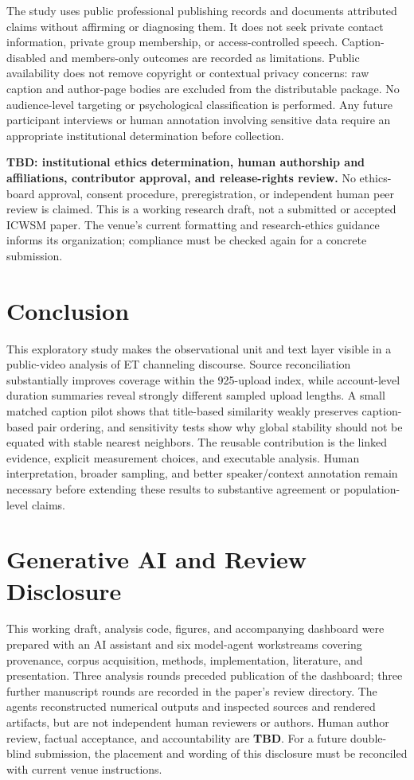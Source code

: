 The study uses public professional publishing records and documents attributed claims without affirming or diagnosing them. It does not seek private contact information, private group membership, or access-controlled speech. Caption-disabled and members-only outcomes are recorded as limitations. Public availability does not remove copyright or contextual privacy concerns: raw caption and author-page bodies are excluded from the distributable package. No audience-level targeting or psychological classification is performed. Any future participant interviews or human annotation involving sensitive data require an appropriate institutional determination before collection.

\textbf{TBD: institutional ethics determination, human authorship and affiliations, contributor approval, and release-rights review.} No ethics-board approval, consent procedure, preregistration, or independent human peer review is claimed. This is a working research draft, not a submitted or accepted ICWSM paper. The venue's current formatting and research-ethics guidance informs its organization; compliance must be checked again for a concrete submission.

\section{Conclusion}
This exploratory study makes the observational unit and text layer visible in a public-video analysis of ET channeling discourse. Source reconciliation substantially improves coverage within the 925-upload index, while account-level duration summaries reveal strongly different sampled upload lengths. A small matched caption pilot shows that title-based similarity weakly preserves caption-based pair ordering, and sensitivity tests show why global stability should not be equated with stable nearest neighbors. The reusable contribution is the linked evidence, explicit measurement choices, and executable analysis. Human interpretation, broader sampling, and better speaker/context annotation remain necessary before extending these results to substantive agreement or population-level claims.

\section*{Generative AI and Review Disclosure}
This working draft, analysis code, figures, and accompanying dashboard were prepared with an AI assistant and six model-agent workstreams covering provenance, corpus acquisition, methods, implementation, literature, and presentation. Three analysis rounds preceded publication of the dashboard; three further manuscript rounds are recorded in the paper's review directory. The agents reconstructed numerical outputs and inspected sources and rendered artifacts, but are not independent human reviewers or authors. Human author review, factual acceptance, and accountability are \textbf{TBD}. For a future double-blind submission, the placement and wording of this disclosure must be reconciled with current venue instructions.

